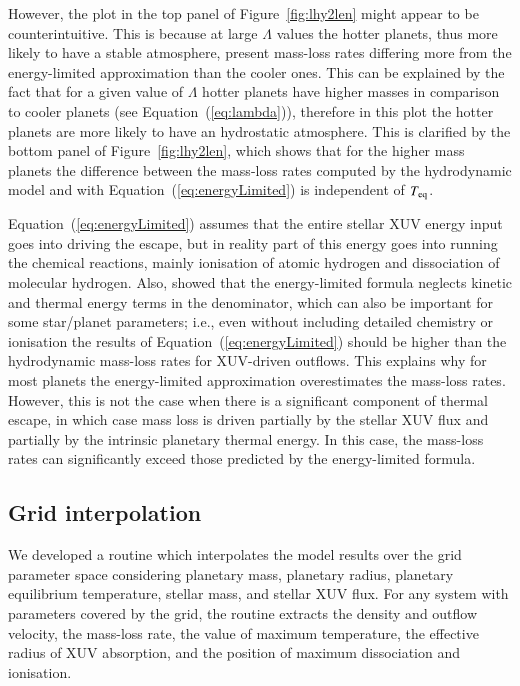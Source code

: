 \documentclass{aa}
\def\Teq{$T_{\rm eq}$}
\begin{document}
However, the plot in the top panel of Figure~\ref{fig:lhy2len}
might appear to be counterintuitive. This is because at large
$\Lambda$ values the hotter planets, thus more likely to have a
stable atmosphere, present mass-loss rates differing more from the
energy-limited approximation than the cooler ones. {This can be
explained by the fact that for a given value of $\Lambda$ hotter
planets have higher masses in comparison to cooler planets (see
Equation~(\ref{eq:lambda})), therefore in this plot the hotter
planets are more likely to have an hydrostatic atmosphere.} This
is clarified by the bottom panel of Figure~\ref{fig:lhy2len},
which shows that for the higher mass planets the difference
between the mass-loss rates computed by the hydrodynamic model and
with Equation~(\ref{eq:energyLimited}) is independent of \Teq.

Equation~(\ref{eq:energyLimited}) assumes that the entire stellar XUV energy input goes into driving the escape, but in reality part of this energy goes into running the chemical reactions, mainly ionisation of atomic hydrogen and dissociation of molecular hydrogen. Also, \citet{erkaev2015} showed that the
energy-limited formula neglects kinetic and thermal energy terms in the denominator, which can also be important for some star/planet parameters; i.e., even without including detailed chemistry or ionisation the results of Equation~(\ref{eq:energyLimited}) should be higher than the hydrodynamic mass-loss rates for XUV-driven outflows. This explains why for most planets the energy-limited approximation overestimates the mass-loss rates. However, this is not the case when there is a significant component of thermal escape, in which
case mass loss is driven partially by the stellar XUV flux and partially by the intrinsic planetary thermal energy. In this case, the mass-loss rates can significantly exceed those predicted by the energy-limited formula.

%
\subsection{Grid interpolation}\label{sec:interpolation}
%
{We developed a routine which interpolates the model results over
the grid parameter space considering planetary mass, planetary
radius, planetary equilibrium temperature, stellar mass, and
stellar XUV flux. For any system with parameters covered by the
grid, the routine extracts the density and outflow velocity, the
mass-loss rate, the value of maximum temperature, the effective
radius of XUV absorption, and the position of maximum dissociation
and ionisation.}
\end{document}
